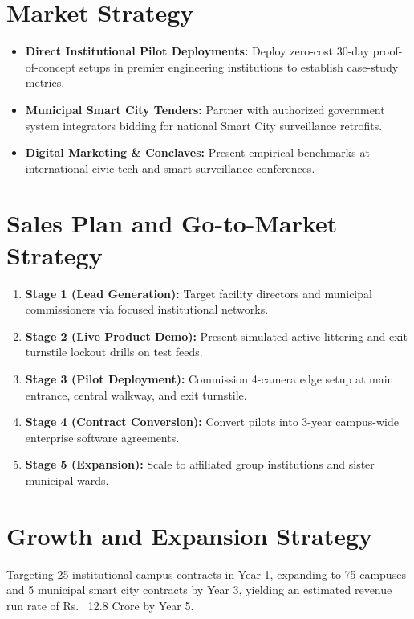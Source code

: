 \documentclass[12pt,a4paper]{report}
\begin{document}
\section{Market Strategy}
\begin{itemize}
\item \textbf{Direct Institutional Pilot Deployments:} Deploy zero-cost 30-day proof-of-concept setups in premier engineering institutions to establish case-study metrics.
\item \textbf{Municipal Smart City Tenders:} Partner with authorized government system integrators bidding for national Smart City surveillance retrofits.
\item \textbf{Digital Marketing \& Conclaves:} Present empirical benchmarks at international civic tech and smart surveillance conferences.
\end{itemize}

\section{Sales Plan and Go-to-Market Strategy}
\begin{enumerate}
\item \textbf{Stage 1 (Lead Generation):} Target facility directors and municipal commissioners via focused institutional networks.
\item \textbf{Stage 2 (Live Product Demo):} Present simulated active littering and exit turnstile lockout drills on test feeds.
\item \textbf{Stage 3 (Pilot Deployment):} Commission 4-camera edge setup at main entrance, central walkway, and exit turnstile.
\item \textbf{Stage 4 (Contract Conversion):} Convert pilots into 3-year campus-wide enterprise software agreements.
\item \textbf{Stage 5 (Expansion):} Scale to affiliated group institutions and sister municipal wards.
\end{enumerate}

\section{Growth and Expansion Strategy}
Targeting 25 institutional campus contracts in Year 1, expanding to 75 campuses and 5 municipal smart city contracts by Year 3, yielding an estimated revenue run rate of Rs.~ 12.8 Crore by Year 5.
\end{document}
